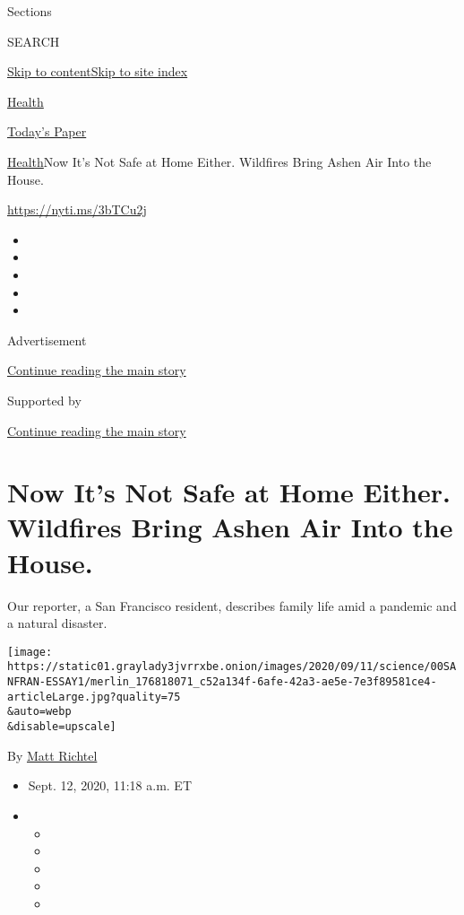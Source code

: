Sections

SEARCH

\protect\hyperlink{site-content}{Skip to
content}\protect\hyperlink{site-index}{Skip to site index}

\href{https://www.nytimes3xbfgragh.onion/section/health}{Health}

\href{https://myaccount.nytimes3xbfgragh.onion/auth/login?response_type=cookie\&client_id=vi}{}

\href{https://www.nytimes3xbfgragh.onion/section/todayspaper}{Today's
Paper}

\href{/section/health}{Health}\textbar{}Now It's Not Safe at Home
Either. Wildfires Bring Ashen Air Into the House.

\url{https://nyti.ms/3bTCu2j}

\begin{itemize}
\item
\item
\item
\item
\item
\end{itemize}

Advertisement

\protect\hyperlink{after-top}{Continue reading the main story}

Supported by

\protect\hyperlink{after-sponsor}{Continue reading the main story}

\hypertarget{now-its-not-safe-at-home-either-wildfires-bring-ashen-air-into-the-house}{%
\section{Now It's Not Safe at Home Either. Wildfires Bring Ashen Air
Into the
House.}\label{now-its-not-safe-at-home-either-wildfires-bring-ashen-air-into-the-house}}

Our reporter, a San Francisco resident, describes family life amid a
pandemic and a natural disaster.

\texttt{[image: https://static01.graylady3jvrrxbe.onion/images/2020/09/11/science/00SANFRAN-ESSAY1/merlin\_176818071\_c52a134f-6afe-42a3-ae5e-7e3f89581ce4-articleLarge.jpg?quality=75\\\&auto=webp\\\&disable=upscale]}

By \href{https://www.nytimes3xbfgragh.onion/by/matt-richtel}{Matt
Richtel}

\begin{itemize}
\item
  Sept. 12, 2020, 11:18 a.m. ET
\item
  \begin{itemize}
  \item
  \item
  \item
  \item
  \item
  \end{itemize}
\end{itemize}

